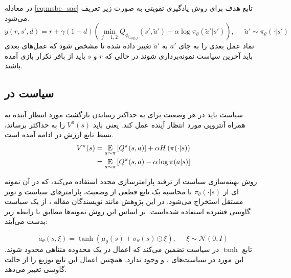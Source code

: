        
       در معادله 
       \eqref{eq:msbe_sac}
       تابع هدف برای روش یادگیری تقویتی 
       به صورت زیر تعریف می‌شود.
       \begin{equation}
       	y(r, s', d) = r + \gamma (1 - d) \left( \min_{j=1,2} Q_{\phi_{\text{targ},j}}(s', \tilde{a}') - \alpha \log \pi_{\theta}(\tilde{a}'|s') \right), \;\;\;\;\; \tilde{a}' \sim \pi_{\theta}(\cdot|s')
       \end{equation}
       نماد عمل بعدی را به جای 
       \(a'\)
        به
        \( \tilde{a}'\)
         تغییر داده شده تا مشخص شود که عمل‌های بعدی باید آخرین سیاست نمونه‌برداری شوند در حالی که 
          \(r\)
           و 
           \(s\)
            باید از بافر تکرار بازی آمده باشند.
            
            
          \subsection{سیاست در }
          سیاست باید در هر وضعیت برای به حداکثر رساندن بازگشت مورد انتظار آینده به همراه آنتروپی مورد انتظار آینده عمل کند. یعنی باید
           \(V^{\pi}(s)\)
            را به حداکثر برساند، بسط تابع ارزش در ادامه آمده است.
          \begin{align}
          	V^{\pi}(s) &= \underset{a \sim \pi}{\mathrm{E}}\left[
          	{Q^{\pi}(s,a)}
          	\right] + \alpha H\left(\pi(\cdot|s)\right) \\
          	&= \underset{a \sim \pi}{\mathrm{E}}\left[
          	{Q^{\pi}(s,a) - \alpha \log \pi(a|s)}
          	\right]
          \end{align}
          
          روش بهینه‌سازی سیاست از ترفند پارامترسازی مجدد
           استفاده می‌کند، که در آن نمونه ای از 
           \(\pi_{\theta}(\cdot|s)\)
            با محاسبه یک تابع قطعی از وضعیت، پارامترهای سیاست و نویز مستقل استخراج می‌شود. در این پژوهش مانند نویسندگان مقاله 
            \cite{DBLP:journals/corr/abs-1801-01290}،
             از یک سیاست گاوسی
              فشرده استفاده شده‌است. بر اساس این روش نمونه‌ها مطابق با رابطه زیر بدست می‌آیند:
              
              \begin{equation}
              	\tilde{a}_{\theta}(s, \xi) = \tanh\left( \mu_{\theta}(s) + \sigma_{\theta}(s) \odot \xi \right), \;\;\;\;\; \xi \sim \mathcal{N}(0, I)
              \end{equation}
              تابع 
              \(\tanh\)
               در سیاست  تضمین می‌کند که اعمال در یک محدوده متناهی محدود شوند. این مورد در سیاست‌های ،  و  وجود ندارد. همچنین اعمال این تابع توزیع را از حالت گاوسی تغییر می‌دهد.
               
